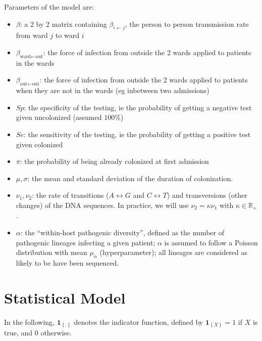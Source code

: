 \documentclass[10pt]{article}
\begin{document}
Parameters of the model are: 
\begin{itemize}
	\item $\beta$: a 2 by 2 matrix containing $\beta_{i \leftarrow j}$, the person to person transmission rate from ward $j$ to ward $i$
	\item $\beta_{\text{ward} \leftarrow \text{out}}$: the force of infection from outside the 2 wards applied to patients in the wards
	\item $\beta_{\text{out} \leftarrow \text{out}}$: the force of infection from outside the 2 wards applied to patients when they are not in the wards (eg inbetween two admissions)
	\item $Sp$: the specificity of the testing, ie the probability of getting a negative test given uncolonized (assumed $100\%$)
	\item $Se$: the sensitivity of the testing, ie the probability of getting a positive test given colonized
	\item $\pi$: the probability of being already colonized at first admission
	\item $\mu,\sigma$: the mean and standard deviation of the duration of colonization.
	\item $\nu_1,\nu_2$: the rate of transitions ($A \leftrightarrow G$ and $C \leftrightarrow T$) and transversions (other changes) of the DNA sequences. In practice, we will use $\nu_2=\kappa\nu_1$ with $\kappa \in \mathbb{R}_+$.
	\item $\alpha$: the ``within-host pathogenic diversity'', defined as the number of pathogenic lineages infecting a given patient; $\alpha$ is assumed to follow a Poisson distribution with mean $\mu_{\alpha}$ (hyperparameter); all lineages are considered as likely to be have been sequenced.
\end{itemize}

\section*{Statistical Model}

In the following, $\mathbf{1}_{\left\lbrace.\right\rbrace}$ denotes the indicator function, defined by $\mathbf{1}_{\left\lbrace X \right\rbrace}=1$ if $X$ is true, and $0$ otherwise.
\end{document}

